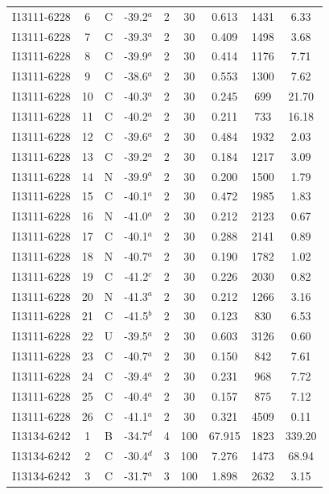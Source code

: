\begin{table}
\begin{tabular}{ccccccccc}
I13111-6228 & 6 & C & -39.2$^{a}$ & 2 & 30 & 0.613 & 1431 & 6.33 \\
I13111-6228 & 7 & C & -39.3$^{a}$ & 2 & 30 & 0.409 & 1498 & 3.68 \\
I13111-6228 & 8 & C & -39.9$^{a}$ & 2 & 30 & 0.414 & 1176 & 7.71 \\
I13111-6228 & 9 & C & -38.6$^{a}$ & 2 & 30 & 0.553 & 1300 & 7.62 \\
I13111-6228 & 10 & C & -40.3$^{a}$ & 2 & 30 & 0.245 & 699 & 21.70 \\
I13111-6228 & 11 & C & -40.2$^{a}$ & 2 & 30 & 0.211 & 733 & 16.18 \\
I13111-6228 & 12 & C & -39.6$^{a}$ & 2 & 30 & 0.484 & 1932 & 2.03 \\
I13111-6228 & 13 & C & -39.2$^{a}$ & 2 & 30 & 0.184 & 1217 & 3.09 \\
I13111-6228 & 14 & N & -39.9$^{a}$ & 2 & 30 & 0.200 & 1500 & 1.79 \\
I13111-6228 & 15 & C & -40.1$^{a}$ & 2 & 30 & 0.472 & 1985 & 1.83 \\
I13111-6228 & 16 & N & -41.0$^{a}$ & 2 & 30 & 0.212 & 2123 & 0.67 \\
I13111-6228 & 17 & C & -40.1$^{a}$ & 2 & 30 & 0.288 & 2141 & 0.89 \\
I13111-6228 & 18 & N & -40.7$^{a}$ & 2 & 30 & 0.190 & 1782 & 1.02 \\
I13111-6228 & 19 & C & -41.2$^{c}$ & 2 & 30 & 0.226 & 2030 & 0.82 \\
I13111-6228 & 20 & N & -41.3$^{a}$ & 2 & 30 & 0.212 & 1266 & 3.16 \\
I13111-6228 & 21 & C & -41.5$^{b}$ & 2 & 30 & 0.123 & 830 & 6.53 \\
I13111-6228 & 22 & U & -39.5$^{a}$ & 2 & 30 & 0.603 & 3126 & 0.60 \\
I13111-6228 & 23 & C & -40.7$^{a}$ & 2 & 30 & 0.150 & 842 & 7.61 \\
I13111-6228 & 24 & C & -39.4$^{a}$ & 2 & 30 & 0.231 & 968 & 7.72 \\
I13111-6228 & 25 & C & -40.4$^{a}$ & 2 & 30 & 0.157 & 875 & 7.12 \\
I13111-6228 & 26 & C & -41.1$^{a}$ & 2 & 30 & 0.321 & 4509 & 0.11 \\
I13134-6242 & 1 & B & -34.7$^{d}$ & 4 & 100 & 67.915 & 1823 & 339.20 \\
I13134-6242 & 2 & C & -30.4$^{d}$ & 3 & 100 & 7.276 & 1473 & 68.94 \\
I13134-6242 & 3 & C & -31.7$^{a}$ & 3 & 100 & 1.898 & 2632 & 3.15 \\

\end{tabular}
\end{table}
